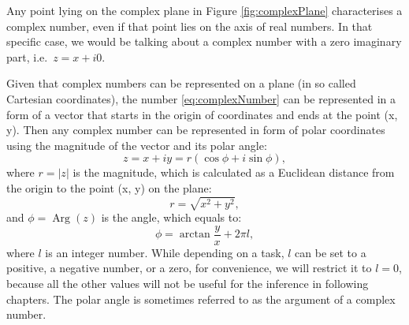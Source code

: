 \documentclass[
]{book}
\DeclareMathOperator\Arg{Arg}
\begin{document}
Any point lying on the complex plane in Figure \ref{fig:complexPlane} characterises a complex number, even if that point lies on the axis of real numbers. In that specific case, we would be talking about a complex number with a zero imaginary part, i.e.~\(z=x+i0\).

Given that complex numbers can be represented on a plane (in so called Cartesian coordinates), the number \eqref{eq:complexNumber} can be represented in a form of a vector that starts in the origin of coordinates and ends at the point (x, y). Then any complex number can be represented in form of polar coordinates using the magnitude of the vector and its polar angle:
\begin{equation}
    z = x+iy = r (\cos \phi + i \sin \phi),
    \label{eq:complexNumberTrigonometric}
\end{equation}
where \(r=|z|\) is the magnitude, which is calculated as a Euclidean distance from the origin to the point (x, y) on the plane:
\begin{equation}
    r = \sqrt{x^2 + y^2},
    \label{eq:complexNumberMagnitude}
\end{equation}
and \(\phi=\Arg(z)\) is the angle, which equals to:
\begin{equation}
    \phi = \arctan \frac{y}{x} + 2 \pi l,
    \label{eq:complexNumberAngle}
\end{equation}
where \(l\) is an integer number. While depending on a task, \(l\) can be set to a positive, a negative number, or a zero, for convenience, we will restrict it to \(l=0\), because all the other values will not be useful for the inference in following chapters. The polar angle is sometimes referred to as the argument of a complex number.
\end{document}
